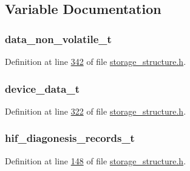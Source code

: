 \subsection{Variable Documentation}
\hypertarget{a00003_a8e66478e65e03ebc9434466e51c0ad0b}{
\subsubsection[{data\+\_\+non\+\_\+volatile\+\_\+t}]{\setlength{\rightskip}{0pt plus 5cm}data\+\_\+non\+\_\+volatile\+\_\+t}}\label{a00003_a8e66478e65e03ebc9434466e51c0ad0b}


Definition at line \hyperlink{a00003_source_l00342}{342} of file \hyperlink{a00003_source}{storage\+\_\+structure.\+h}.

\hypertarget{a00003_a95029dff9c90f6a6907353ba86eb3f33}{
\subsubsection[{device\+\_\+data\+\_\+t}]{\setlength{\rightskip}{0pt plus 5cm}device\+\_\+data\+\_\+t}}\label{a00003_a95029dff9c90f6a6907353ba86eb3f33}


Definition at line \hyperlink{a00003_source_l00322}{322} of file \hyperlink{a00003_source}{storage\+\_\+structure.\+h}.

\hypertarget{a00003_a4726b814166e222a6f13e21453f76d8d}{
\subsubsection[{hif\+\_\+diagonesis\+\_\+records\+\_\+t}]{\setlength{\rightskip}{0pt plus 5cm}hif\+\_\+diagonesis\+\_\+records\+\_\+t}}\label{a00003_a4726b814166e222a6f13e21453f76d8d}


Definition at line \hyperlink{a00003_source_l00148}{148} of file \hyperlink{a00003_source}{storage\+\_\+structure.\+h}.

